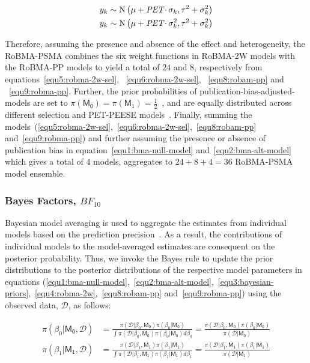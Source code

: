 \documentclass[12pt, english]{article}
\begin{document}
    \begin{align}
        y_k & \sim \text{N} \left(\mu+ \text{\textit{PET}} \cdotp \sigma_k, \tau^{2} + \sigma_k^{2} \right) \label{equ8:robam-pp} \\
        y_k & \sim \text{N} \left(\mu+ \text{\textit{PET}} \cdotp \sigma_k^2, \tau^{2} + \sigma_k^{2} \right) \label{equ9:robma-pp}
    \end{align}

    Therefore, assuming the presence and absence of the effect and heterogeneity, the RoBMA-PSMA combines the six weight functions in RoBMA-2W models with the RoBMA-PP models to yield a total of $24$ and $8$, respectively from equations~\ref{equ5:robma-2w-sel}, ~\ref{equ6:robma-2w-sel}, ~\ref{equ8:robam-pp} and ~\ref{equ9:robma-pp}. Further, the prior probabilities of publication-bias-adjusted-models are set to $\pi(\mathsf{M_0}) = \pi(\mathsf{M_1}) = \frac{1}{2}$~\parencite{maier2022}, and are equally distributed across different selection and PET-PEESE models~\parencites{gronau2021, clyde2011, hoeting1999, jeffreys1998}. Finally, summing the models~(\ref{equ5:robma-2w-sel},~\ref{equ6:robma-2w-sel},~\ref{equ8:robam-pp} and~\ref{equ9:robma-pp}) and further assuming the presence or absence of publication bias in equation~\ref{equ1:bma-null-model} and~\ref{equ2:bma-alt-model} which gives a total of $4$ models, aggregates to $24 + 8 + 4 = 36$ RoBMA-PSMA model ensemble.

    \subsubsection{Bayes Factors, $BF_{10}$}\label{subsubsec2.3.2:bayes-factors-$bf_{10}$}
    Bayesian model averaging is used to aggregate the estimates from individual models based on the prediction precision~\parencites{hinne2020, hoeting1999, leamer1978}. As a result, the contributions of individual models to the model-averaged estimates are consequent on the posterior probability. Thus, we invoke the Bayes rule to update the prior distributions to the posterior distributions of the respective model parameters in equations (\ref{equ1:bma-null-model},~\ref{equ2:bma-alt-model},~\ref{equ3:bayesian-priors},~\ref{equ4:robma-2w},~\ref{equ8:robam-pp} and~\ref{equ9:robma-pp}) using the observed data, $\mathcal{D}$, as follows:

    \begin{align}
        \pi(\beta_0 | \mathsf{M_0}, \mathcal{D}) &= \frac{\pi(\mathcal{D} | \beta_0, \mathsf{M_0}) \pi(\beta_0 | \mathsf{M_0})}{\int\pi(\mathcal{D} | \beta_0, \mathsf{M_0}) \pi(\beta_0 | \mathsf{M_0}) d\beta_0} = \frac{\pi(\mathcal{D} | \beta_0, \mathsf{M_0}) \pi(\beta_0 | \mathsf{M_0})}{\pi(\mathcal{D} | \mathsf{M_0})} \label{equ10:bayes-rule-null} \\
        \pi(\beta_1 | \mathsf{M_1}, \mathcal{D}) &= \frac{\pi(\mathcal{D} | \beta_1, \mathsf{M_1})\pi(\beta_1 | \mathsf{M_1})}{\int\pi(\mathcal{D} | \beta_1, \mathsf{M_1}) \pi(\beta_1|\mathsf{M_1}) d\beta_1} = \frac{\pi(\mathcal{D} | \beta_1, \mathsf{M_1}) \pi(\beta_1 | \mathsf{M_1})}{\pi(\mathcal{D} | \mathsf{M_1})} \label{equ11-bayes-rule-alt}
    \end{align}
\end{document}
